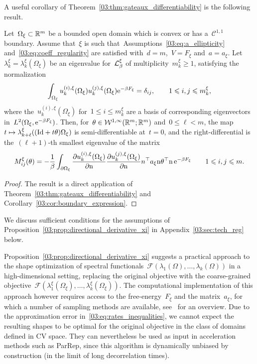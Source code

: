     A useful corollary of Theorem~\ref{03:thm:gateaux_differentiability} is the following result.
    \begin{proposition}
        \label{03:prop:directional_derivative_xi}
        Let~$\Omega_\xi\subset\mathbb{R}^m$ be a bounded open domain which is convex or has a~$\mathcal C^{1,1}$ boundary.
        Assume that~$\xi$ is such that~Assumptions~\eqref{03:eq:a_ellipticity} and~\eqref{03:eq:coeff_regularity} are satisfied with~$d=m$,~$V=F_\xi$ and~$a=a_\xi$.
        Let~$\lambda_k^\xi=\lambda_k^\xi(\Omega_\xi)$ be an eigenvalue for~$\mathcal{L}_\beta^\xi$ of multiplicity~$m_k^\xi\geq 1$, satisfying the normalization
        \[\int_{\Omega_\xi} u_k^{(i),\xi}(\Omega_\xi)u_k^{(j),\xi}(\Omega_\xi)\mathrm{e}^{-\beta F_\xi} = \delta_{ij},\qquad 1\leqslant i,j\leqslant m_k^\xi,\]
        where the~$u_k^{(i),\xi}(\Omega_\xi)$ for~$1\leq i\leq m_k^\xi$ are a basis of corresponding eigenvectors in~$L^2(\Omega_\xi,\mathrm{e}^{-\beta F_\xi})$.
        Then, for~$\theta\in {\mathcal{W}}^{1,\infty}(\mathbb{R}^m;\mathbb{R}^m)$ and~$0\leq \ell<m$, the map~$t\mapsto \lambda_{k+\ell}^{\xi}((\mathrm{Id} + t\theta)\Omega_\xi)$ is semi-differentiable at~$t=0$, and the right-differential is the~$(\ell+1)$-th smallest eigenvalue of the matrix
        \begin{equation}
        \label{03:eq:shape_derivative_xi}
        M_{ij}^{\xi}(\theta) = -\frac1\beta\int_{\partial \Omega_\xi}\frac{\partial u_k^{(i),\xi}(\Omega_\xi)}{\partial\mathrm{n}}\frac{\partial u_k^{(j),\xi}(\Omega_\xi)}{\partial\mathrm{n}} n^\top a_\xi\mathrm{n}\theta^\top\mathrm{n}\,\mathrm{e}^{-\beta F_\xi}\qquad 1\leqslant i,j\leqslant m.
        \end{equation}
    \end{proposition}
    \begin{proof}
        The result is a direct application of Theorem~\ref{03:thm:gateaux_differentiability} and Corollary~\ref{03:cor:boundary_expression}.
    \end{proof}
    We discuss sufficient conditions for the assumptions of Proposition~\ref{03:prop:directional_derivative_xi} in Appendix~\ref{03:sec:tech_reg} below.

    Proposition~\ref{03:prop:directional_derivative_xi} suggests a practical approach to the shape optimization of spectral functionals~$\mathcal F(\lambda_1(\Omega),\dots,\lambda_k(\Omega))$ in a high-dimensional setting, replacing the original objective with the coarse-grained objective~$\mathcal F(\lambda_1^\xi(\Omega_\xi),\dots,\lambda^\xi_k(\Omega_\xi))$.
    The computational implementation of this approach however requires access to the free-energy~$F_\xi$ and the matrix~$a_\xi$, for which a number of sampling methods are available, see~\cite{LRS10} for an overview.
    Due to the approximation error in~\eqref{03:eq:rates_inequalities}, we cannot expect the resulting shapes to be optimal for the original objective in the class of domains defined in CV space. They can nevertheless be used as input in acceleration methods such as ParRep, since this algorithm is dynamically unbiased by construction (in the limit of long decorrelation times).


